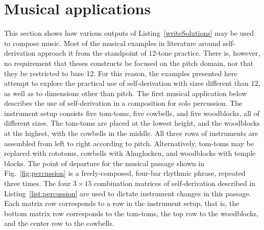 


\section{Musical applications}

This section shows how various outputs of Listing~\ref{writeSolutions} may be used to compose music. Most of the musical examples in literature around self-derivation approach it from the standpoint of 12-tone practice. There is, however, no requirement that theses constructs be focused on the pitch domain, nor that they be restricted to base 12. For this reason, the examples presented here attempt to explore the practical use of self-derivation with sizes different than 12, as well as to dimensions other than pitch. The first musical application below describes the use of self-derivation in a composition for solo percussion. The instrument setup consists five tom-toms, five cowbells, and five woodblocks, all of different sizes. The tom-toms are placed at the lowest height, and the woodblocks at the highest, with the cowbells in the middle. All three rows of instruments are assembled from left to right according to pitch. Alternatively, tom-toms may be replaced with rototoms, cowbells with Almglocken, and woodblocks with temple blocks. The point of departure for the musical passage shown in Fig.~\ref{fig:percussion} is a freely-composed, four-bar rhythmic phrase, repeated three times. The four $3 \times 15$ combination matrices of self-derivation described in Listing~\ref{list:percussion} are used to dictate instrument changes in this passage. Each matrix row corresponds to a row in the instrument setup, that is, the bottom matrix row corresponds to the tom-toms, the top row to the woodblocks, and the center row to the cowbells.

